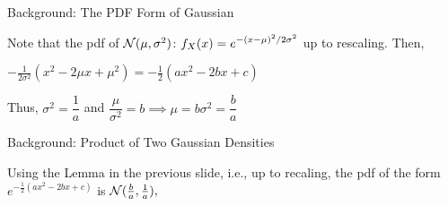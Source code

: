 \begin{frame}{Background: The PDF Form of Gaussian}


  \plitemsep 0.2in
\bci 

\item<3->  Note that the pdf of $\mathcal N(\mu,\sigma^2)$: $\displaystyle f_X(x) =
  e^{-(x-\mu)^2/2\sigma^2}$ up to rescaling. Then,

  \bci
\item<4-> $\displaystyle - \frac{1}{2 \sigma^2} ( x^2 - 2\mu x + \mu^2) = -\frac{1}{2}(ax^2 -2bx +c)$
  
\item<5-> Thus, $\sigma^2 = \dfrac{1}{a}$ and $\dfrac{\mu}{\sigma^2} = b
  \implies \mu = b \sigma^2 = \dfrac{b}{a}  $

  \eci
  
  
\eci
\end{frame}


\begin{frame}{Background: Product of Two Gaussian Densities}


\plitemsep 0.1in
\bci 

\item<2->[\bluef{Proof.}] Using the Lemma in the previous slide, i.e.,
up to recaling, the pdf of the form $\displaystyle e^{-\frac{1}{2}(ax^2 -2bx +c)}$ is $\mathcal N(\frac{b}{a},\frac{1}{a}),$  

\eci
\end{frame}

